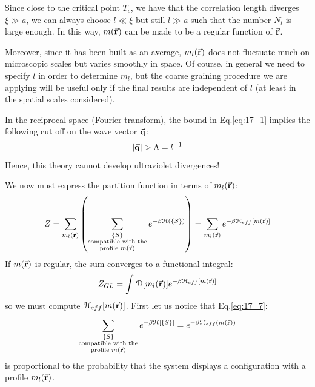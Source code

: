 \documentclass[../main/main.tex]{subfiles}
\begin{document}
\begin{remark}
Since close to the critical point \( T_c \), we have that the correlation length diverges \( \xi \gg a \), we can always choose \( l \ll \xi  \) but still \( l \gg a \) such that the number \( N_l \) is large enough.
In this way, \( m(\va{r}) \) can be made to be a regular function of \( \va{r} \).
\end{remark}

Moreover, since it has been built as an average, \( m_l (\va{r}) \) does not fluctuate much on microscopic scales but varies smoothly in space. Of course, in general we need to specify \( l \) in order to determine \( m_l \), but the coarse graining procedure we are applying will be useful only if the final results are independent of \( l \)  (at least in the spatial scales considered).

\begin{remark}
In the reciprocal space (Fourier transform), the bound in Eq.\eqref{eq:17_1} implies the following cut off on the wave vector \( \va{q} \):
\begin{equation*}
  \abs{\va{q}} > \Lambda  = l^{-1}
\end{equation*}
Hence, this theory cannot develop ultraviolet divergences!
\end{remark}

We now must express the partition function in terms of \( m_l (\va{r}) \):
\begin{equation*}
  Z = \sum_{m_l (\va{r})}^{} \qty(\sum_{ \substack{ \{ S \} \\ \text{compatible with the} \\ \text{profile } m(\va{r})}   }^{} e^{-\beta \mathcal{H} ( \{ S \}  )}   )
 = \sum_{m_l(\va{r})}^{} e^{-\beta \mathcal{H}_{eff} [m(\va{r})]}
\end{equation*}
If \( m(\va{r}) \) is regular, the sum converges to a functional integral:
\begin{equation}
   Z_{GL} = \int_{}^{} \mathcal{D}  \qty[m_l (\va{r})]  e^{-\beta \mathcal{H}_{eff}[m(\va{r})]}
   \label{eq:17_8}
\end{equation}
so we must compute \( \mathcal{H}_{eff} [m(\va{r})] \).
First let us notice that Eq.\eqref{eq:17_7}:
\begin{equation*}
  \sum_{ \substack{ \{ S \} \\ \text{compatible with the} \\ \text{profile } m(\va{r})}   }^{} e^ {- \beta \mathcal{H} [ \{ S \}  ]}
  = e^{-\beta \mathcal{H}_{eff} (m (\va{r}))}
\end{equation*}
is proportional to the probability that the system displays a configuration with a profile \( m_l (\va{r}) \).
\end{document}
